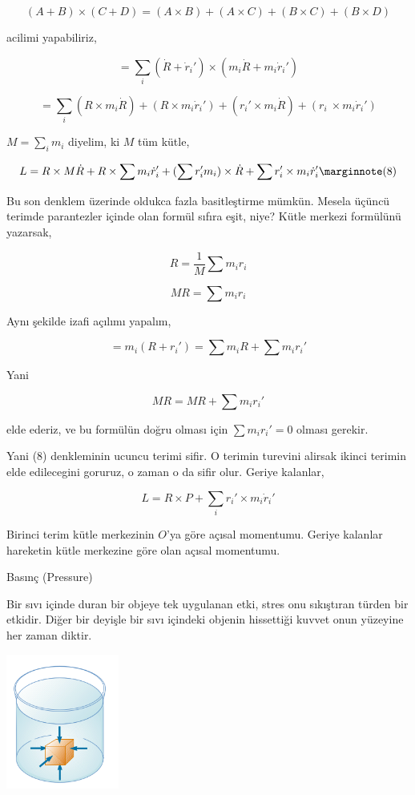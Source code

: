 \documentclass[12pt,fleqn]{article}\usepackage{../../common}
\begin{document}
$$
(A + B) \times (C+D) = (A \times B) + (A \times C) + (B \times C) + (B \times D) 
$$

acilimi yapabiliriz, 

$$
 = \sum_i (\dot{R} + \dot{r}_i') \times (m_i \dot{R} + m_i \dot{r}_i' )
$$


$$
= \sum_i (R \times m_i \dot{R}) +
  (R \times m_i \dot{r}_i') +
  (r_i' \times m_i \dot{R}) +
  (r_i\ \times m_i \dot{r}_i')   
$$

$M = \sum_i m_i $ diyelim, ki $M$ tüm kütle,

$$
L = R \times M\dot{R} +
R \times \sum m_i \dot{r}_i' +
(\sum r_i' m_i) \times \dot{R} +
\sum r_i' \times m_i \dot{r}_i'
\mlabel{8}
$$

Bu son denklem üzerinde oldukca fazla basitleştirme mümkün. Mesela üçüncü
terimde parantezler içinde olan formül sıfıra eşit, niye? Kütle merkezi
formülünü yazarsak,

$$
R = \frac{1}{M} \sum m_i r_i
$$

$$
MR = \sum m_i r_i
$$

Aynı şekilde izafi açılımı yapalım,

$$
= m_i (R + r_i') = \sum m_i R + \sum m_i r_i'
$$

Yani

$$
MR = MR + \sum m_i r_i'
$$

elde ederiz, ve bu formülün doğru olması için $\sum m_i r_i' = 0$ olması gerekir.

Yani (8) denkleminin ucuncu terimi sifir. O terimin turevini alirsak
ikinci terimin elde edilecegini goruruz, o zaman o da sifir olur. Geriye
kalanlar,

$$
L = R \times P + \sum_i r_i' \times m_i \dot{r}_i' 
$$

Birinci terim kütle merkezinin $O$'ya göre açısal momentumu. Geriye
kalanlar hareketin kütle merkezine göre olan açısal momentumu. 


















Basınç (Pressure)

Bir sıvı içinde duran bir objeye tek uygulanan etki, stres onu
sıkıştıran türden bir etkidir. Diğer bir deyişle bir sıvı içindeki
objenin hissettiği kuvvet onun yüzeyine her zaman diktir.

\includegraphics[width=10em]{phy_005_basics_07.png}
\end{document}
